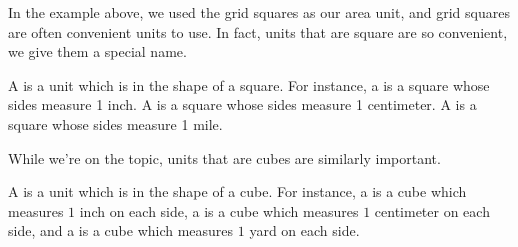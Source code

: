 \documentclass{ximera}
\begin{document}
In the example above, we used the grid squares as our area unit, and grid squares are often convenient units to use. In fact, units that are square are so convenient, we give them a special name.
\begin{definition}
A  is a unit which is in the shape of a square. For instance, a  is a square whose sides measure 1 inch. A  is a square whose sides measure 1 centimeter. A  is a square whose sides measure 1 mile.
\end{definition}
While we're on the topic, units that are cubes are similarly important.
\begin{definition}
A  is a unit which is in the shape of a cube. For instance, a  is a cube which measures $1$ inch on each side, a  is a cube which measures $1$ centimeter on each side, and a  is a cube which measures $1$ yard on each side.
\end{definition}
\end{document}
